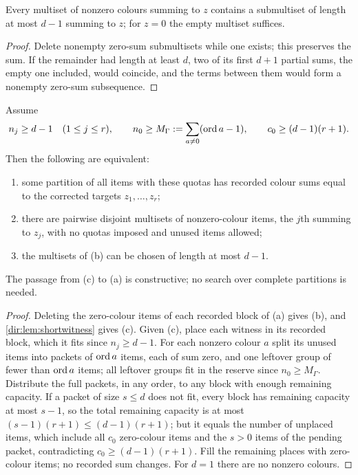 \begin{lemma}\label{dir:lem:shortwitness}
Every multiset of nonzero colours summing to $z$ contains a submultiset of length at most $d-1$
summing to $z$; for $z=0$ the empty multiset suffices.
\end{lemma}

\begin{proof}
Delete nonempty zero-sum submultisets while one exists; this preserves the sum. If the remainder had
length at least $d$, two of its first $d+1$ partial sums, the empty one included, would coincide, and
the terms between them would form a nonempty zero-sum subsequence.
\end{proof}

\begin{theorem}\label{dir:thm:packing}
Assume
\[
 n_j\ge d-1\quad(1\le j\le r),\qquad n_0\ge M_\Gamma:=\sum_{a\ne0}(\operatorname{ord} a-1),\qquad c_0\ge(d-1)(r+1).
\]
Then the following are equivalent:
\begin{enumerate}[label=\textup{(\alph*)}]
\item some partition of all items with these quotas has recorded colour sums equal to the corrected
targets $z_1,\dots,z_r$;
\item there are pairwise disjoint multisets of nonzero-colour items, the $j$th summing to $z_j$, with no
quotas imposed and unused items allowed;
\item the multisets of \textup{(b)} can be chosen of length at most $d-1$.
\end{enumerate}
The passage from \textup{(c)} to \textup{(a)} is constructive; no search over complete partitions is needed.
\end{theorem}

\begin{proof}
Deleting the zero-colour items of each recorded block of (a) gives (b), and \cref{dir:lem:shortwitness}
gives (c). Given (c), place each witness in its recorded block, which it fits since $n_j\ge d-1$. For each
nonzero colour $a$ split its unused items into packets of $\operatorname{ord} a$ items, each of sum zero, and one
leftover group of fewer than $\operatorname{ord} a$ items; all leftover groups fit in the reserve since $n_0\ge M_\Gamma$.
Distribute the full packets, in any order, to any block with enough remaining capacity. If a packet of
size $s\le d$ does not fit, every block has remaining capacity at most $s-1$, so the total remaining
capacity is at most $(s-1)(r+1)\le(d-1)(r+1)$; but it equals the number of unplaced items, which include all
$c_0$ zero-colour items and the $s>0$ items of the pending packet, contradicting $c_0\ge(d-1)(r+1)$. Fill
the remaining places with zero-colour items; no recorded sum changes. For $d=1$ there are no nonzero
colours.
\end{proof}

